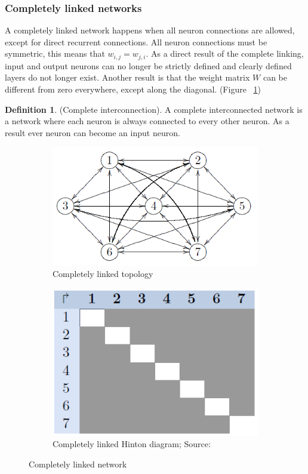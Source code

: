 \documentclass[pdftex,a4paper,12pt,twoside]{report}
\theoremstyle{plain} \newtheorem{theorem}{Theorem} \newtheorem{proposition}{Proposition} \newtheorem{lemma}{Lemma} \newtheorem*{corollary}{Corollary}
\theoremstyle{definition} \newtheorem{definition}{Definition} \newtheorem{conjecture}{Conjecture} \newtheorem*{example}{Example} \newtheorem{algorithm}{Algorithm}
\theoremstyle{remark} \newtheorem*{remark}{Remark} \newtheorem*{note}{Note} \newtheorem{case}{Case}
\begin{document}
\subsubsection{Completely linked networks}
A completely linked network happens when all neuron connections are allowed, except for direct recurrent connections. All neuron connections must be symmetric, this means that $w_{i,j} = w_{j,i}$. As a direct result of the complete linking, input and output neurons can no longer be strictly defined and clearly defined layers do not longer exist. Another result is that the weight matrix $W$ can be different from zero everywhere, except along the diagonal. (Figure ~\ref{fig:completelylinked})
\begin{definition}
(Complete interconnection). A complete interconnected network is a network where each neuron is always connected to every other neuron. As a result ever neuron can become an input neuron.
\end{definition}
\begin{figure}
\centering
	\begin{subfigure}[b]{0.49\textwidth}
	\centering
	\includegraphics[width=\textwidth]{./img/Completelylinked-Topology.png}
	\caption{Completely linked topology}
	\end{subfigure}
	\begin{subfigure}[b]{0.49\textwidth}
	\centering
	\includegraphics[width=\textwidth]{./img/Completelylinked-Hinton.png}
	\caption{Completely linked Hinton diagram; Source:\citep{Kriesel2013}}
	\end{subfigure}
\caption{Completely linked network}
\label{fig:completelylinked}
\end{figure}
\end{document}
